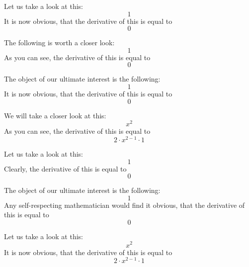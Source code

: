 \documentclass{article}
\begin{document}
Let us take a look at this:
\begin{equation}
1 
\end{equation}
It is now obvious, that the derivative of this is equal to
\begin{equation}
0 
\end{equation}

The following is worth a closer look:
\begin{equation}
1 
\end{equation}
As you can see, the derivative of this is equal to
\begin{equation}
0 
\end{equation}

The object of our ultimate interest is the following:
\begin{equation}
1 
\end{equation}
It is now obvious, that the derivative of this is equal to
\begin{equation}
0 
\end{equation}

We will take a closer look at this:
\begin{equation}
x ^{2 } 
\end{equation}
As you can see, the derivative of this is equal to
\begin{equation}
2 \cdot x ^{2 - 1 } \cdot 1 
\end{equation}

Let us take a look at this:
\begin{equation}
1 
\end{equation}
Clearly, the derivative of this is equal to
\begin{equation}
0 
\end{equation}

The object of our ultimate interest is the following:
\begin{equation}
1 
\end{equation}
Any self-respecting mathematician would find it obvious, that the derivative of this is equal to
\begin{equation}
0 
\end{equation}

Let us take a look at this:
\begin{equation}
x ^{2 } 
\end{equation}
It is now obvious, that the derivative of this is equal to
\begin{equation}
2 \cdot x ^{2 - 1 } \cdot 1 
\end{equation}
\end{document}
